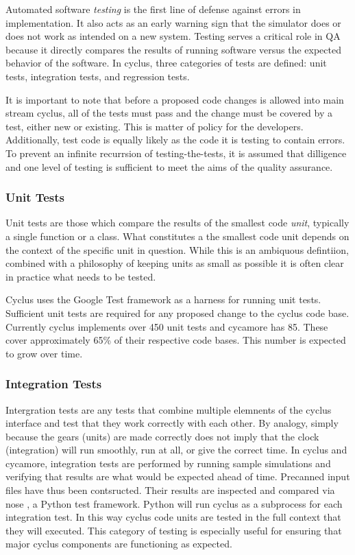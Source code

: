 Automated software \emph{testing} is the first line of defense against
errors in implementation. It also acts as an early warning sign that the
simulator does or does not work as intended on a new system.
Testing serves a critical role in QA because it directly compares the 
results of running software versus the expected behavior of the software.
In cyclus, three categories of tests are defined: unit tests, integration 
tests, and regression tests. 

It is important to note that before a proposed
code changes is allowed into main stream cyclus, all of the tests must pass
and the change must be covered by a test, either new or existing. This is 
matter of policy for the developers. Additionally, test code is equally likely 
as the code it is testing to contain errors. To prevent an infinite recurrsion 
of testing-the-tests, it is assumed that dilligence and one level of testing 
is sufficient to meet the aims of the quality assurance.

\subsubsection{Unit Tests}

Unit tests are those which compare the results of the smallest code \emph{unit}, 
typically a single function or a class. What constitutes a the smallest code
unit depends on the context of the specific unit in question. While this is 
an ambiquous defintiion, combined with a philosophy of keeping units as small
as possible it is often clear in practice what needs to be tested.

Cyclus uses the Google Test framework \cite{inc_googletest_2008} as a harness for running unit 
tests. Sufficient unit tests are required for any proposed change to the cyclus
code base. Currently cyclus implements over 450 unit tests and cycamore has 
85.  These cover approximately 65\% of their respective code bases. This number 
is expected to grow over time. 

\subsubsection{Integration Tests} 

Intergration tests are any tests that combine multiple elemnents of the 
cyclus interface and test that they work correctly with each other.  By analogy, 
simply because the gears (units) are made correctly does not imply that the 
clock (integration) will run smoothly, run at all, or give the correct time.
In cyclus and cycamore, integration tests are performed by running sample
simulations and verifying that results are what would be expected ahead of 
time. Precanned input files have thus been contsructed. Their results 
are inspected and compared via nose \cite{pellerin_nose_2007}, a Python test framework.
Python will run cyclus as a subprocess for each integration test. In this
way cyclus code units are tested in the full context that they will
executed. This category of testing is especially useful for ensuring that 
major cyclus components are functioning as expected.

